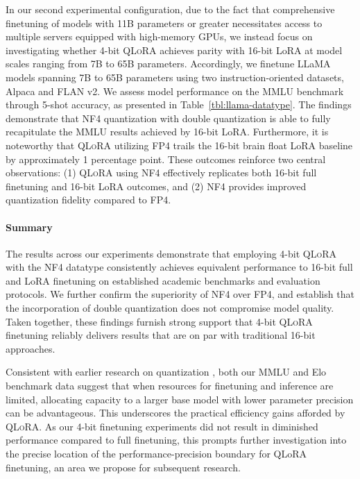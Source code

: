In our second experimental configuration, due to the fact that comprehensive finetuning of models with 11B parameters or greater necessitates access to multiple servers equipped with high-memory GPUs, we instead focus on investigating whether 4-bit \textsc{QLoRA} achieves parity with 16-bit LoRA at model scales ranging from 7B to 65B parameters. Accordingly, we finetune LLaMA models spanning 7B to 65B parameters using two instruction-oriented datasets, Alpaca and FLAN v2. We assess model performance on the MMLU benchmark through 5-shot accuracy, as presented in Table~\ref{tbl:llama-datatype}. The findings demonstrate that NF4 quantization with double quantization is able to fully recapitulate the MMLU results achieved by 16-bit LoRA. Furthermore, it is noteworthy that \textsc{QLoRA} utilizing FP4 trails the 16-bit brain float LoRA baseline by approximately 1 percentage point. These outcomes reinforce two central observations: (1) \textsc{QLoRA} using NF4 effectively replicates both 16-bit full finetuning and 16-bit LoRA outcomes, and (2) NF4 provides improved quantization fidelity compared to FP4.

\paragraph{Summary} The results across our experiments demonstrate that employing 4-bit \textsc{QLoRA} with the NF4 datatype consistently achieves equivalent performance to 16-bit full and LoRA finetuning on established academic benchmarks and evaluation protocols. We further confirm the superiority of NF4 over FP4, and establish that the incorporation of double quantization does not compromise model quality. Taken together, these findings furnish strong support that 4-bit \textsc{QLoRA} finetuning reliably delivers results that are on par with traditional 16-bit approaches.

Consistent with earlier research on quantization \citep{dettmers2022case}, both our MMLU and Elo benchmark data suggest that when resources for finetuning and inference are limited, allocating capacity to a larger base model with lower parameter precision can be advantageous. This underscores the practical efficiency gains afforded by \textsc{QLoRA}. As our 4-bit finetuning experiments did not result in diminished performance compared to full finetuning, this prompts further investigation into the precise location of the performance-precision boundary for QLoRA finetuning, an area we propose for subsequent research.

